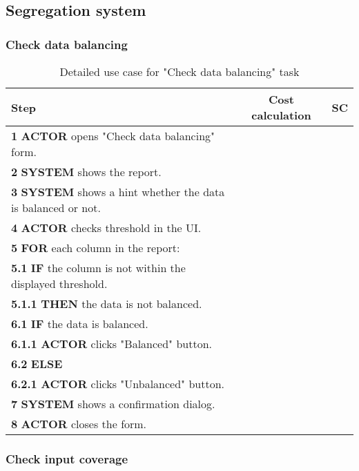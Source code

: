 \subsection{Segregation system}

\subsubsection{Check data balancing}

\begin{table}[H]
\centering
\begin{tabular}{|l|c|c|}
\hline
\textbf{Step} & \textbf{Cost calculation} & \textbf{SC} \\
\hline
\textbf{1} \textbf{ACTOR} opens "Check data balancing" form. & & \\
\hline
\textbf{2} \textbf{SYSTEM} shows the report. & & \\
\hline
\textbf{3} \textbf{SYSTEM} shows a hint whether the data is balanced or not. & & \\
\hline
\textbf{4} \textbf{ACTOR} checks threshold in the UI. & & \\
\hline
\textbf{5} \textbf{FOR} each column in the report: & & \\
\hline
\textbf{5.1} \textbf{IF} the column is not within the displayed threshold. & & \\
\hline
\textbf{5.1.1} \textbf{THEN} the data is not balanced. & & \\
\hline
\textbf{6.1} \textbf{IF} the data is balanced. & & \\
\hline
\textbf{6.1.1} \textbf{ACTOR} clicks "Balanced" button. & & \\
\hline
\textbf{6.2} \textbf{ELSE} & & \\
\hline
\textbf{6.2.1} \textbf{ACTOR} clicks "Unbalanced" button. & & \\
\hline
\textbf{7} \textbf{SYSTEM} shows a confirmation dialog. & & \\
\hline
\textbf{8} \textbf{ACTOR} closes the form. & & \\
\hline
\end{tabular}
\caption{Detailed use case for "Check data balancing" task}
\label{table:check_data_balancing}
\end{table}

\subsubsection{Check input coverage}

